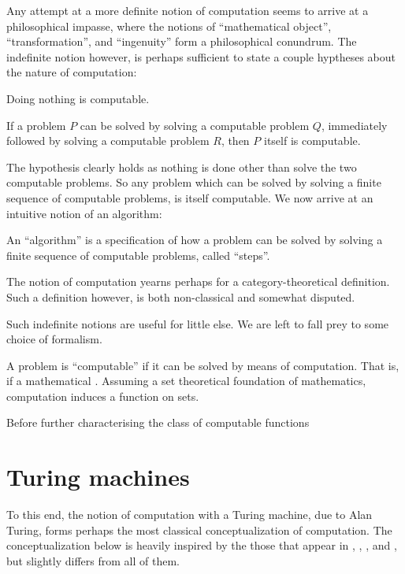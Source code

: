 Any attempt at a more definite notion of computation seems to arrive at a
philosophical impasse, where the notions of ``mathematical object'',
``transformation'', and ``ingenuity'' form a philosophical conundrum. The
indefinite notion however, is perhaps sufficient to state a couple hyptheses
about the nature of computation:

\begin{hypothesis} \label{ths:do-nothing} Doing nothing is computable.
\end{hypothesis}

\begin{hypothesis} \label{ths:problem-composition} If a problem $P$ can be
solved by solving a computable problem $Q$, immediately followed by solving a
computable problem $R$, then $P$ itself is computable. \end{hypothesis}

The hypothesis clearly holds as nothing is done other than solve the two
computable problems.  So any problem which can be solved by solving a finite sequence
of computable problems, is itself computable. We now arrive at an intuitive
notion of an algorithm:

\begin{notion} \label{ntn:problem-algorithm} An ``algorithm'' is a
specification of how a problem can be solved by solving a finite sequence of
computable problems, called ``steps''.\end{notion}

The notion of computation yearns perhaps for a category-theoretical definition.
Such a definition however, is both non-classical and somewhat disputed.

Such indefinite notions are useful for little else. We are left to fall prey to
some choice of formalism. 

A problem is ``computable'' if it can be solved by means of computation. That
is, if a mathematical . Assuming a set theoretical foundation of mathematics,
computation induces a function on sets.

Before further characterising the class of computable functions

\section{Turing machines}

To this end, the notion of computation with a Turing
machine, due to Alan Turing\cite{turing-1936-7}, forms perhaps the most
classical conceptualization of computation. The conceptualization below is
heavily inspired by the those that appear in \cite{tourlakis-1984},
\cite{jones-1997}, \cite{homer-selman-2011}, and \cite{sipser-2013}, but
slightly differs from all of them.

